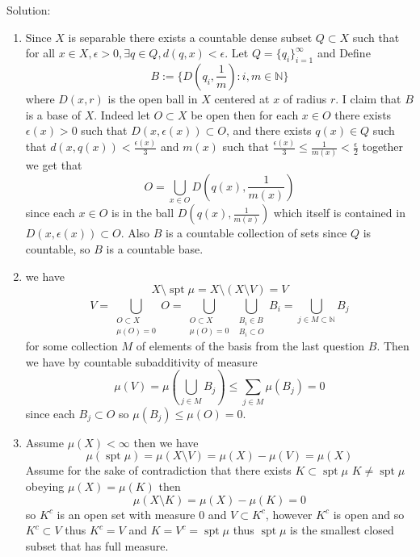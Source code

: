 \documentclass[11pt]{article}
\DeclareMathOperator{\spt}{spt}
\newcommand{\solution}[1]{{{\textcolor{header}{Solution:} \textcolor{solution}{#1}}}}
\begin{document}
\solution{
    \begin{enumerate}
        \item
            Since $X$ is separable there exists a countable dense subset $Q \subset X$ such that for all $x \in X, \epsilon > 0, \exists q \in Q, d(q,x) < \epsilon$.
            Let $Q = \{q_i\}_{i=1}^{\infty}$ and Define
            \[
                B := \{D(q_i,\frac{1}{m}) : i,m \in \mathbb{N}\}
            \] 
            where $D(x,r)$ is the open ball in  $X$ centered at  $x$ of radius $r$. I claim that $B$ is a base of $X$.
            Indeed let  $O \subset X$ be open then for each $x \in O$ there exists  $\epsilon(x) >0$ such that $D(x,\epsilon(x)) \subset O$,
            and there exists $q(x) \in Q$ such that  $d(x,q(x)) < \frac{\epsilon(x)}{3}$ and $m(x)$ such that  $\frac{\epsilon(x)}{3} \le \frac{1}{m(x)} < \frac{\epsilon}{2}$ together we get that 
            \[
                O = \bigcup_{x \in O}D(q(x),\frac{1}{m(x)})
            \] 
            since each $x \in O$ is in the ball  $D(q(x),\frac{1}{m(x)})$ which itself is contained in $D(x,\epsilon(x)) \subset O$. Also $B$ is a countable collection of sets since  $Q$ is countable, so $B$ is a countable base. 
        \item 
            we have
            \[
            X \setminus \spt \mu = X \setminus (X \setminus V) = V
            \] 
            \[
                V = \bigcup_{\substack{O \subset X \\ \mu(O) = 0}}O = \bigcup_{\substack{O \subset X\\ \mu(O) = 0}}\bigcup_{\substack{B_i \in B\\ B_i \subset O}}B_i = \bigcup_{j \in M \subset \mathbb{N}}^{}B_j
            \] 
            for some collection $M$ of elements of the basis from the last question $B$. Then we have by countable subadditivity of measure
            \[
                \mu(V) = \mu(\bigcup_{j \in M}B_j) \le \sum_{j \in M}^{}\mu(B_j) = 0
            \] 
            since each $B_j \subset O$ so $\mu(B_j) \le \mu(O) = 0$.
        \item Assume $\mu(X) < \infty$ then we have
            \[
            \mu(\spt \mu) = \mu(X \setminus V) = \mu(X) - \mu(V) = \mu(X)
            \] 
            Assume for the sake of contradiction that there exists $K \subset \spt \mu$ $K \ne \spt \mu$ obeying $\mu(X) = \mu(K)$
            then
            \[
            \mu(X \setminus K) = \mu(X) - \mu(K) = 0
            \] 
            so $K^{c}$ is an open set with measure 0 and $V \subset K^{c}$, however $K^{c}$ is open and so $K^{c} \subset V$ thus $K^{c} = V$ and $K = V^{c} = \spt \mu$ thus $\spt \mu$ is the smallest closed subset that has full measure.
    \end{enumerate}
}
\end{document}
